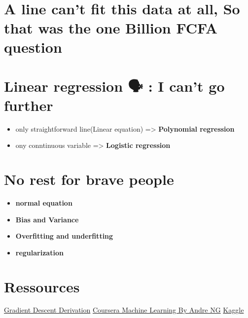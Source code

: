 \documentclass[11pt]{article}
\providecommand{\tightlist}{%
      \setlength{\itemsep}{0pt}\setlength{\parskip}{0pt}}
\begin{document}
    \begin{center}
    \end{center}
    { \hspace*{\fill} \\}
    
    \section{A line can't fit this data at all, So that was the one Billion
FCFA
question}\label{a-line-cant-fit-this-data-at-all-so-that-was-the-one-billion-fcfa-question}

    \section{Linear regression 🗣 : I can't go
further}\label{linear-regression-i-cant-go-further}

\begin{itemize}
\tightlist
\item
  only straightforward line(Linear equation) =\textgreater{}
  \textbf{Polynomial regression}
\item
  ony conntinuous variable =\textgreater{} \textbf{Logistic regression}
\end{itemize}

    \section{No rest for brave people
💪🏿💪🏿💪🏿}\label{no-rest-for-brave-people}

\begin{itemize}
\tightlist
\item
  \textbf{normal equation}
\item
  \textbf{Bias and Variance}
\item
  \textbf{Overfitting and underfitting}
\item
  \textbf{regularization}
\end{itemize}

    \section{Ressources}\label{ressources}

    \href{http://mccormickml.com/2014/03/04/gradient-descent-derivation/}{Gradient
Descent Derivation}
\href{https://www.coursera.org/learn/machine-learning}{Coursera Machine
Learning By Andre NG} \href{https://www.kaggle.com}{Kaggle}


    
    
    
    
\end{document}
